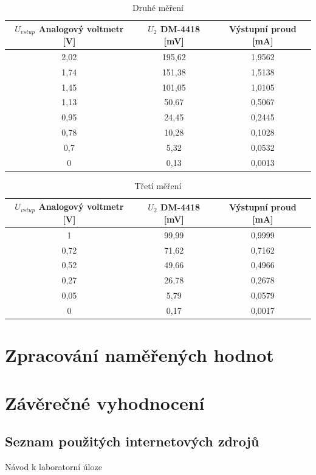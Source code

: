 \documentclass[a4paper,12pt]{article}   %
\begin{document}
\begin{table}
    \centering
    \begin{tabular}{|c|c|c|}
        $U_{vstup}$ Analogový voltmetr [V] &$U_{2}$ DM-4418 [mV] &Výstupní proud [mA] \\\hline\hline
        2,02&195,62&1,9562\\\hline
        1,74&151,38&1,5138\\\hline
        1,45&101,05&1,0105\\\hline
        1,13&50,67&0,5067\\\hline
        0,95&24,45&0,2445\\\hline
        0,78&10,28&0,1028\\\hline
        0,7&5,32&0,0532\\\hline
        0&0,13&0,0013\\\hline
    \end{tabular}
    \caption{Druhé měření}
\end{table}

\begin{table}
    \centering
    \begin{tabular}{|c|c|c|}
        $U_{vstup}$ Analogový voltmetr [V] &$U_{2}$ DM-4418 [mV] &Výstupní proud [mA] \\\hline\hline
        1&99,99&0,9999\\\hline
        0,72&71,62&0,7162\\\hline
        0,52&49,66&0,4966\\\hline
        0,27&26,78&0,2678\\\hline
        0,05&5,79&0,0579\\\hline
        0&0,17&0,0017\\\hline
    \end{tabular}
    \caption{Třetí měření}
\end{table}

\section{Zpracování naměřených hodnot}


\section{Závěrečné vyhodnocení}



\clearpage
\renewcommand{\refname}{Seznam použité literatury a~zdrojů informací} 

\begin{thebibliography}{99}

\subsection*{Seznam použitých internetových zdrojů}
     Návod k laboratorní úloze
    
\end{thebibliography}
\end{document}
